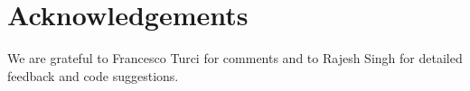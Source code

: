 \section*{Acknowledgements}
We are grateful to Francesco Turci for comments and to Rajesh Singh for detailed feedback and code suggestions. 



